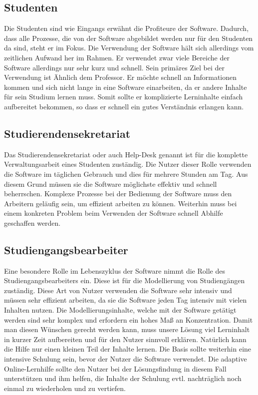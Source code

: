 \subsection{Studenten}
Die Studenten sind wie Eingangs erwähnt die Profiteure der Software. Dadurch, dass alle Prozesse, die von der Software abgebildet werden nur für den Studenten da sind, steht er im Fokus. Die Verwendung der Software hält sich allerdings vom zeitlichen Aufwand her im Rahmen. Er verwendet zwar viele Bereiche der Software allerdings nur sehr kurz und schnell. Sein primäres Ziel bei der Verwendung ist Ähnlich dem Professor. Er möchte schnell an Informationen kommen und sich nicht lange in eine Software einarbeiten, da er andere Inhalte für sein Studium lernen muss. Somit sollte er komplizierte Lerninhalte einfach aufbereitet bekommen, so dass er schnell ein gutes Verständnis erlangen kann.

\subsection{Studierendensekretariat}
Das Studierendensekretariat oder auch Help-Desk genannt ist für die komplette Verwaltungsarbeit eines Studenten zuständig. Die Nutzer dieser Rolle verwenden die Software im täglichen Gebrauch und dies für mehrere Stunden am Tag. Aus diesem Grund müssen sie die Software möglichste effektiv und schnell beherrschen. Komplexe Prozesse bei der Bedienung der Software muss den Arbeitern geläufig sein, um effizient arbeiten zu können. Weiterhin muss bei einem konkreten Problem beim Verwenden der Software schnell Abhilfe geschaffen werden. 
\subsection{Studiengangsbearbeiter}
Eine besondere Rolle im Lebenszyklus der Software nimmt die Rolle des Studiengangsbearbeiters ein. Diese ist für die Modellierung von Studiengängen zuständig. Diese Art von Nutzer verwenden die Software sehr intensiv und müssen sehr effizient arbeiten, da sie die Software jeden Tag intensiv mit vielen Inhalten nutzen. Die Modellierungsinhalte, welche mit der Software getätigt werden sind sehr komplex und erfordern ein hohes Maß an Konzentration. Damit man diesen Wünschen gerecht werden kann, muss unsere Lösung viel Lerninhalt in kurzer Zeit aufbereiten und für den Nutzer sinnvoll erklären. Natürlich kann die Hilfe nur einen kleinen Teil der Inhalte lernen. Die Basis sollte weiterhin eine intensive Schulung sein, bevor der Nutzer die Software verwendet. Die adaptive Online-Lernhilfe sollte den Nutzer bei der Lösungsfindung in diesem Fall unterstützen und ihm helfen, die Inhalte der Schulung evtl. nachträglich noch einmal zu wiederholen und zu vertiefen.


